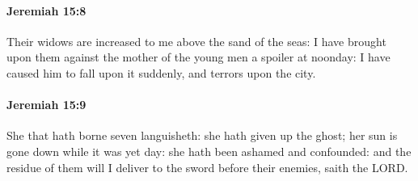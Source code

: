 		\paragraph{Jeremiah 15:8} %
			\label{JEREMIAH-15-8}

			Their widows are increased to me above the sand of the seas: I have brought upon them against the mother of the young men a spoiler at noonday: I have caused him to fall upon it suddenly, and terrors upon the city.


		\paragraph{Jeremiah 15:9} %
			\label{JEREMIAH-15-9}

			She that hath borne seven languisheth: she hath given up the ghost; her sun is gone down while it was yet day: she hath been ashamed and confounded: and the residue of them will I deliver to the sword before their enemies, saith the LORD.

